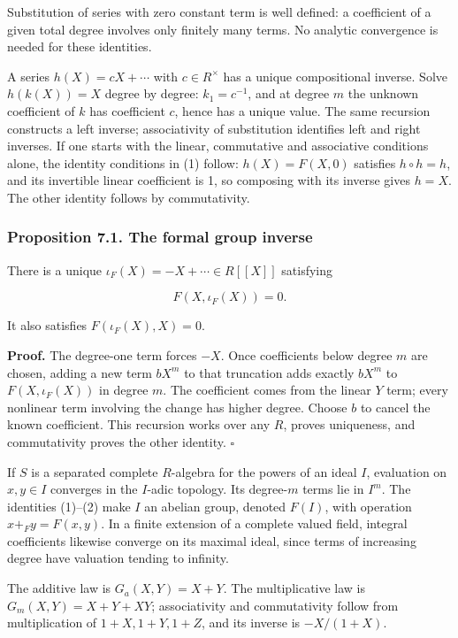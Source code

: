\documentclass[11pt,a4paper]{article}
\begin{document}
Substitution of series with zero constant term is well defined: a
coefficient of a given total degree involves only finitely many terms.
No analytic convergence is needed for these identities.

A series \(h(X)=cX+\cdots\) with \(c\in R^\times\) has a unique
compositional inverse. Solve \(h(k(X))=X\) degree by degree:
\(k_1=c^{-1}\), and at degree \(m\) the unknown coefficient of \(k\) has
coefficient \(c\), hence has a unique value. The same recursion
constructs a left inverse; associativity of substitution identifies left
and right inverses. If one starts with the linear, commutative and
associative conditions alone, the identity conditions in (1) follow:
\(h(X)=F(X,0)\) satisfies \(h\circ h=h\), and its invertible linear
coefficient is 1, so composing with its inverse gives \(h=X\). The other
identity follows by commutativity.

\subsubsection{Proposition 7.1. The formal group
inverse}\label{proposition-7.1.-the-formal-group-inverse}

There is a unique \(\iota_F(X)=-X+\cdots\in R[[X]]\) satisfying

\[
F(X,\iota_F(X))=0.
\tag{2}
\]

It also satisfies \(F(\iota_F(X),X)=0\).

\textbf{Proof.} The degree-one term forces \(-X\). Once coefficients
below degree \(m\) are chosen, adding a new term \(bX^m\) to that
truncation adds exactly \(bX^m\) to \(F(X,\iota_F(X))\) in degree \(m\).
The coefficient comes from the linear \(Y\) term; every nonlinear term
involving the change has higher degree. Choose \(b\) to cancel the known
coefficient. This recursion works over any \(R\), proves uniqueness, and
commutativity proves the other identity. \(\square\)

If \(S\) is a separated complete \(R\)-algebra for the powers of an
ideal \(I\), evaluation on \(x,y\in I\) converges in the \(I\)-adic
topology. Its degree-\(m\) terms lie in \(I^m\). The identities (1)--(2)
make \(I\) an abelian group, denoted \(F(I)\), with operation
\(x+_F y=F(x,y)\). In a finite extension of a complete valued field,
integral coefficients likewise converge on its maximal ideal, since
terms of increasing degree have valuation tending to infinity.

The additive law is \(G_a(X,Y)=X+Y\). The multiplicative law is
\(G_m(X,Y)=X+Y+XY\); associativity and commutativity follow from
multiplication of \(1+X,1+Y,1+Z\), and its inverse is \(-X/(1+X)\).
\end{document}
